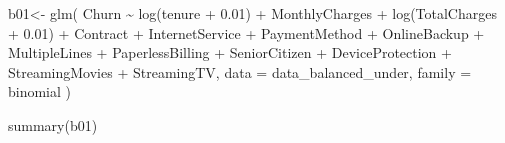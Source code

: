 \documentclass[
  twoside]{article}
\newenvironment{Shaded}{\begin{snugshade}}{\end{snugshade}}
\newcommand{\AttributeTok}[1]{\textcolor[rgb]{0.77,0.63,0.00}{#1}}
\newcommand{\FloatTok}[1]{\textcolor[rgb]{0.00,0.00,0.81}{#1}}
\newcommand{\FunctionTok}[1]{\textcolor[rgb]{0.00,0.00,0.00}{#1}}
\newcommand{\NormalTok}[1]{#1}
\newcommand{\OtherTok}[1]{\textcolor[rgb]{0.56,0.35,0.01}{#1}}
\newcommand{\SpecialCharTok}[1]{\textcolor[rgb]{0.00,0.00,0.00}{#1}}
\begin{document}
\begin{Shaded}
\begin{Highlighting}[]
\NormalTok{b01}\OtherTok{\textless{}{-}} \FunctionTok{glm}\NormalTok{(}
\NormalTok{  Churn }\SpecialCharTok{\textasciitilde{}} \FunctionTok{log}\NormalTok{(tenure }\SpecialCharTok{+} \FloatTok{0.01}\NormalTok{)}
  \SpecialCharTok{+}\NormalTok{ MonthlyCharges}
  \SpecialCharTok{+} \FunctionTok{log}\NormalTok{(TotalCharges }\SpecialCharTok{+} \FloatTok{0.01}\NormalTok{)}
  \SpecialCharTok{+}\NormalTok{ Contract  }\SpecialCharTok{+}\NormalTok{ InternetService }\SpecialCharTok{+}\NormalTok{ PaymentMethod }
  \SpecialCharTok{+}\NormalTok{ OnlineBackup }\SpecialCharTok{+}\NormalTok{ MultipleLines }\SpecialCharTok{+}\NormalTok{ PaperlessBilling }\SpecialCharTok{+}\NormalTok{ SeniorCitizen  }
  \SpecialCharTok{+}\NormalTok{ DeviceProtection }\SpecialCharTok{+}\NormalTok{ StreamingMovies }\SpecialCharTok{+}\NormalTok{ StreamingTV,}
  \AttributeTok{data =}\NormalTok{ data\_balanced\_under,}
  \AttributeTok{family =}\NormalTok{ binomial}
\NormalTok{)}

\FunctionTok{summary}\NormalTok{(b01)}
\end{Highlighting}
\end{Shaded}
\end{document}
